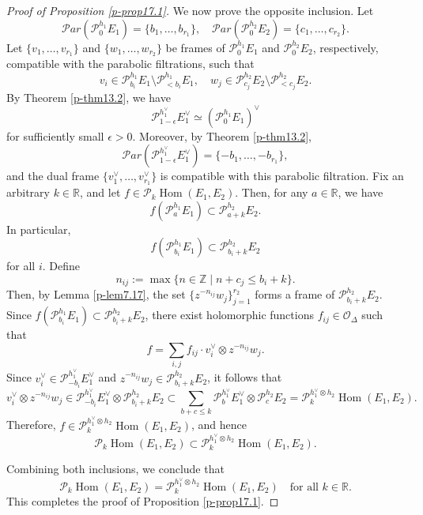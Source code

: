 \documentclass[12pt,twoside]{amsart}
\DeclareMathOperator{\Hom}{Hom}
\theoremstyle{definition}
\begin{document}
\begin{proof}[Proof of Proposition \ref{p-prop17.1}]
We now prove the opposite inclusion. 
Let  
\[
\mathcal{P}ar(\mathcal{P}^{h_1}_0 E_1) = \{b_1, \ldots, b_{r_1}\}, \quad
\mathcal{P}ar(\mathcal{P}^{h_2}_0 E_2) = \{c_1, \ldots, c_{r_2}\}.
\]  
Let \( \{v_1, \ldots, v_{r_1}\} \) and \( \{w_1, \ldots, w_{r_2}\} \) be 
frames of \( \mathcal{P}^{h_1}_0 E_1 \) and 
\( \mathcal{P}^{h_2}_0 E_2 \), respectively, compatible with the parabolic filtrations, such that  
\[
v_i \in \mathcal{P}^{h_1}_{b_i} E_1 \setminus \mathcal{P}^{h_1}_{< b_i} E_1,\quad 
w_j \in \mathcal{P}^{h_2}_{c_j} E_2 \setminus \mathcal{P}^{h_2}_{< c_j} E_2.
\] 
By Theorem \ref{p-thm13.2}, we have  
\[
\mathcal{P}^{h_1^\vee}_{1 - \epsilon} E_1^\vee \simeq (\mathcal{P}^{h_1}_0 E_1)^\vee
\] 
for sufficiently small $\epsilon > 0$.
Moreover, by Theorem \ref{p-thm13.2},  
\[
\mathcal{P}ar(\mathcal{P}^{h_1^\vee}_{1 - \epsilon} E_1^\vee) = \{-b_1, \ldots, -b_{r_1}\},
\]  
and the dual frame \( \{v_1^\vee, \ldots, v_{r_1}^\vee\} \) is 
compatible with this parabolic filtration. 
Fix an arbitrary \( k \in \mathbb{R} \), and let \( f \in \mathcal{P}_k \Hom(E_1, E_2) \).  
Then, for any \( a \in \mathbb{R} \), we have  
\[
f(\mathcal{P}^{h_1}_a E_1) \subset \mathcal{P}^{h_2}_{a + k} E_2.
\]  
In particular,
\[
f(\mathcal{P}^{h_1}_{b_i} E_1) \subset 
\mathcal{P}^{h_2}_{b_i + k} E_2 
\] 
for all $i$. 
Define  
\[
n_{ij} := \max \{ n \in \mathbb{Z} \mid n + c_j \leq b_i + k \}.
\]  
Then, by Lemma \ref{p-lem7.17}, the set 
\( \{z^{-n_{ij}} w_j\}_{j = 1}^{r_2} \) 
forms a frame of \( \mathcal{P}^{h_2}_{b_i + k} E_2 \).  
Since \( f(\mathcal{P}^{h_1}_{b_i} E_1) \subset \mathcal{P}^{h_2}_{b_i + k} E_2 \), 
there exist holomorphic functions \( f_{ij} \in \mathcal{O}_\Delta \) such that
\[
f = \sum_{i,j} f_{ij} \cdot v_i^\vee \otimes z^{-n_{ij}} w_j.
\] 
Since \( v_i^\vee \in \mathcal{P}^{h_1^\vee}_{-b_i} E_1^\vee \) 
and \( z^{-n_{ij}} w_j \in \mathcal{P}^{h_2}_{b_i + k} E_2 \), it follows that  
\[
v_i^\vee \otimes z^{-n_{ij}} w_j 
\in \mathcal{P}^{h_1^\vee}_{-b_i} 
E_1^\vee \otimes \mathcal{P}^{h_2}_{b_i + k} E_2 
\subset \sum_{b + c \leq k} \mathcal{P}^{h_1^\vee}_b E_1^\vee \otimes \mathcal{P}^{h_2}_c E_2 
= \mathcal{P}^{h_1^\vee \otimes h_2}_k \Hom(E_1, E_2).
\]
Therefore, \( f \in \mathcal{P}^{h_1^\vee \otimes h_2}_k \Hom(E_1, E_2) \), and hence
\[
\mathcal{P}_k \Hom(E_1, E_2) \subset \mathcal{P}^{h_1^\vee \otimes h_2}_k \Hom(E_1, E_2).
\]

Combining both inclusions, we conclude that
\[
\mathcal{P}_k \Hom(E_1, E_2) = \mathcal{P}^{h_1^\vee \otimes h_2}_k \Hom(E_1, E_2)
\quad \text{for all } k \in \mathbb{R}.
\]
This completes the proof of Proposition \ref{p-prop17.1}.
\end{proof}
\end{document}
